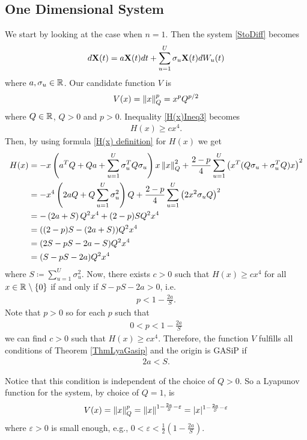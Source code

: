 \documentclass[a4paper,12pt,twoside,BCOR=10mm]{scrbook}
\begin{document}
\subsection{One Dimensional System}
We start by looking at the case when $n = 1$. Then the system \eqref{StoDiff} becomes
\begin{align}\label{SDE 1d}
    d\mathbf{X}(t) = a\mathbf{X}(t)dt + \sum_{u = 1}^U \sigma_u \mathbf{X}(t) dW_u(t)
\end{align}
where $a, \sigma_u \in \mathbb{R}^{}$. Our candidate function $V$ is
\begin{align*}
    V(x) = \left\lVert x\right\rVert_Q^p = x^p Q^{p/2}
\end{align*}
where $Q\in \mathbb{R}^{}$, $Q > 0$ and $p > 0$. Inequality \eqref{H(x)Ineq3} becomes
\begin{align*}
    H(x) \geq cx^4.
\end{align*}
Then, by using formula \eqref{H(x) definition} for $H(x)$ we get
\begin{align*}
    H(x) &= -x\left(a^T Q + Qa + \sum_{u = 1}^U \sigma_u^T Q \sigma_u \right)x \left\lVert x\right\rVert_{Q}^{2} + \frac{2 - p}{4} \sum_{u = 1}^U \left(x^T (Q\sigma_u + \sigma_u^T Q) x\right)^2\\
    &= -x^4\left(2a Q + Q\sum_{u = 1}^U \sigma_u^2\right)Q + \frac{2 - p}{4} \sum_{u = 1}^U\left(2x^2\sigma_u Q\right)^2\\
    &= -\left(2a + S\right) Q^2x^4 + (2 - p)SQ^2x^4\\
    &= ((2-p)S - (2a + S))Q^2 x^4\\
    &= (2S - pS - 2a - S) Q^2 x^4\\
    &= (S - pS - 2a)Q^2 x^4
\end{align*}
where $S \coloneqq \sum\limits_{u = 1}^U \sigma_u^2$. Now, there exists $c > 0$ such that $H(x) \geq cx^4$ for all $x \in \mathbb{R}^{}\setminus \{0\}$ if and only if $S - pS - 2a > 0$, i.e.
\begin{align*}
    p < 1 - \frac{2a}{S}.
\end{align*}
Note that $p > 0$ so for each $p$ such that
\begin{align*}
    0 < p < 1 - \frac{2a}{S}
\end{align*}
we can find $c > 0$ such that $H(x) \geq cx^4$. Therefore, the function $V$ fulfills all conditions of Theorem \ref{ThmLyaGasip} and the origin is GASiP if
\begin{align*}
    2a < S.
\end{align*}

Notice that this condition is independent of the choice of $Q > 0$. So a Lyapunov function for the system, by choice of $Q = 1$, is
\begin{align*}
    V(x) = \left\lVert x\right\rVert_Q^p = \left\lVert x\right\rVert^{1 - \frac{2a}{S} - \varepsilon} = | x |^{1 - \frac{2a}{S} - \varepsilon}
\end{align*}
where $\varepsilon > 0$ is small enough, e.g., $0 < \varepsilon < \frac{1}{2}\left(1 - \frac{2a}{S}\right)$.
\end{document}
